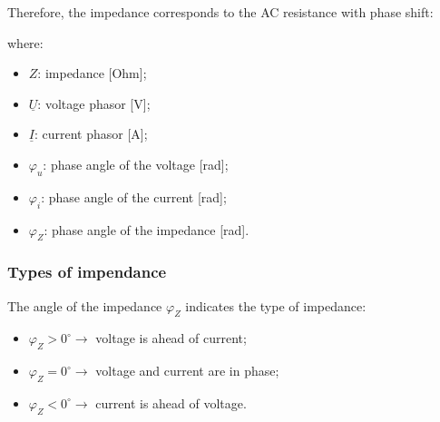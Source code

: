 \documentclass{article}
\begin{document}

Therefore, the impedance corresponds to the AC resistance with phase shift:

where:

\begin{minipage}{0.5\textwidth}
    \begin{itemize}
            \item $Z$: impedance [Ohm];
            \item $\underline{U}$: voltage phasor [V];
            \item $\underline{I}$: current phasor [A];
    \end{itemize}
\end{minipage}
\begin{minipage}{0.5\textwidth}
    \begin{itemize}
            \item $\varphi_u$: phase angle of the voltage [rad];
            \item $\varphi_i$: phase angle of the current [rad];
            \item $\varphi_Z$: phase angle of the impedance [rad].
    \end{itemize}
\end{minipage}

\subsubsection{Types of impendance}
The angle of the impedance $\varphi_Z$ indicates the type of impedance:
\begin{itemize}
    \item $\varphi_Z > 0^{\circ} \rightarrow$ voltage is ahead of current;
    \item $\varphi_Z = 0^{\circ} \rightarrow$ voltage and current are in phase;
    \item $\varphi_Z < 0^{\circ} \rightarrow$ current is ahead of voltage.
\end{itemize}
\end{document}

